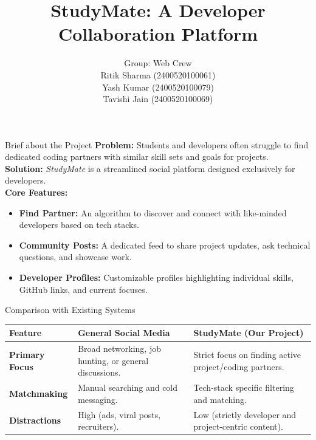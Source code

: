 \documentclass[11pt]{beamer}
\title[StudyMate (Mini-Project)]{StudyMate: A Developer Collaboration Platform}
\subtitle{}
\author[Web Crew]{Group: Web Crew \\ \vspace{0.5cm} \small Ritik Sharma (2400520100061) \\ Yash Kumar (2400520100079) \\ Tavishi Jain (2400520100069)}
\institute[]{INC - 454}
\date{}
\begin{document}
\begin{frame}
    \titlepage
\end{frame}

\begin{frame}{Brief about the Project}
    \textbf{Problem:} Students and developers often struggle to find dedicated coding partners with similar skill sets and goals for projects. \\ \vspace{0.5cm}
    \textbf{Solution:} \textit{StudyMate} is a streamlined social platform designed exclusively for developers. \\ \vspace{0.3cm}
    \textbf{Core Features:}
    \begin{itemize}
        \item \textbf{Find Partner:} An algorithm to discover and connect with like-minded developers based on tech stacks.
        \item \textbf{Community Posts:} A dedicated feed to share project updates, ask technical questions, and showcase work.
        \item \textbf{Developer Profiles:} Customizable profiles highlighting individual skills, GitHub links, and current focuses.
    \end{itemize}
\end{frame}

\begin{frame}{Comparison with Existing Systems}
    \begin{table}
        \centering
        \renewcommand{\arraystretch}{1.6} 
        \begin{tabular}{@{} p{2.5cm} p{4cm} p{4cm} @{}}
            \toprule
            \textbf{Feature} & \textbf{General Social Media} & \textbf{StudyMate (Our Project)} \\ 
            \midrule
            \textbf{Primary Focus} & Broad networking, job hunting, or general discussions. & Strict focus on finding active project/coding partners. \\ 
            \textbf{Matchmaking} & Manual searching and cold messaging. & Tech-stack specific filtering and matching. \\ 
            \textbf{Distractions} & High (ads, viral posts, recruiters). & Low (strictly developer and project-centric content). \\ 
            \bottomrule
        \end{tabular}
    \end{table}
\end{frame}
\end{document}
